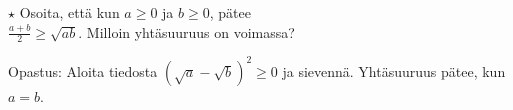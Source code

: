 \begin{tehtavasivu}
\begin{tehtava} 
$\star$ Osoita, että kun $a \geq 0$ ja $b \geq 0$, pätee \\ $\frac{a+b}{2} \geq \sqrt{ab}$. Milloin yhtäsuuruus on voimassa?
    \begin{vastaus}
     Opastus: Aloita tiedosta $\left(\sqrt{a}-\sqrt{b}\right)^2 \geq 0$ ja sievennä. Yhtäsuuruus pätee, kun $a = b$.
    \end{vastaus}
\end{tehtava}

\end{tehtavasivu}
